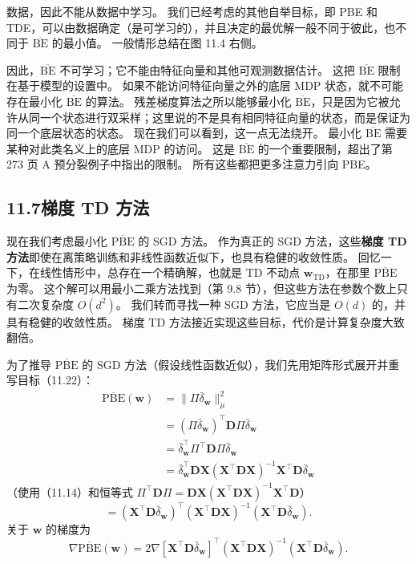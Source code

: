 \documentclass[UTF8, 12pt, fontset=fandol, oneside]{ctexart}
\begin{document}
数据，因此不能从数据中学习。
我们已经考虑的其他自举目标，即 PBE 和 TDE，可以由数据确定（是可学习的），并且决定的最优解一般不同于彼此，也不同于 $\overline{\mathrm{BE}}$ 的最小值。
一般情形总结在图 11.4 右侧。

因此，$\overline{\mathrm{BE}}$ 不可学习；它不能由特征向量和其他可观测数据估计。
这把 $\overline{\mathrm{BE}}$ 限制在基于模型的设置中。
如果不能访问特征向量之外的底层 MDP 状态，就不可能存在最小化 $\overline{\mathrm{BE}}$ 的算法。
残差梯度算法之所以能够最小化 $\overline{\mathrm{BE}}$，只是因为它被允许从同一个状态进行双采样；这里说的不是具有相同特征向量的状态，而是保证为同一个底层状态的状态。
现在我们可以看到，这一点无法绕开。
最小化 $\overline{\mathrm{BE}}$ 需要某种对此类名义上的底层 MDP 的访问。
这是 $\overline{\mathrm{BE}}$ 的一个重要限制，超出了第 273 页 A 预分裂例子中指出的限制。
所有这些都把更多注意力引向 PBE。

\subsection*{11.7\quad 梯度 TD 方法}

现在我们考虑最小化 $\overline{\mathrm{PBE}}$ 的 SGD 方法。
作为真正的 SGD 方法，这些\textbf{梯度 TD 方法}即使在离策略训练和非线性函数近似下，也具有稳健的收敛性质。
回忆一下，在线性情形中，总存在一个精确解，也就是 TD 不动点 $\mathbf{w}_{\mathrm{TD}}$，在那里 $\overline{\mathrm{PBE}}$ 为零。
这个解可以用最小二乘方法找到（第 9.8 节），但这些方法在参数个数上只有二次复杂度 $O(d^2)$。
我们转而寻找一种 SGD 方法，它应当是 $O(d)$ 的，并具有稳健的收敛性质。
梯度 TD 方法接近实现这些目标，代价是计算复杂度大致翻倍。

为了推导 $\overline{\mathrm{PBE}}$ 的 SGD 方法（假设线性函数近似），我们先用矩阵形式展开并重写目标（11.22）：
\begin{equation}
\begin{aligned}
\overline{\mathrm{PBE}}(\mathbf{w})
&=\|\Pi\bar\delta_{\mathbf{w}}\|_\mu^2\\
&=(\Pi\bar\delta_{\mathbf{w}})^\top\mathbf{D}\Pi\bar\delta_{\mathbf{w}}\\
&=\bar\delta_{\mathbf{w}}^\top\Pi^\top\mathbf{D}\Pi\bar\delta_{\mathbf{w}}\\
&=\bar\delta_{\mathbf{w}}^\top\mathbf{D}\mathbf{X}(\mathbf{X}^\top\mathbf{D}\mathbf{X})^{-1}\mathbf{X}^\top\mathbf{D}\bar\delta_{\mathbf{w}}
\end{aligned}
\tag{11.25}
\end{equation}
（使用（11.14）和恒等式
$\Pi^\top\mathbf{D}\Pi=\mathbf{D}\mathbf{X}(\mathbf{X}^\top\mathbf{D}\mathbf{X})^{-1}\mathbf{X}^\top\mathbf{D}$）
\begin{equation}
=\left(\mathbf{X}^\top\mathbf{D}\bar\delta_{\mathbf{w}}\right)^\top
\left(\mathbf{X}^\top\mathbf{D}\mathbf{X}\right)^{-1}
\left(\mathbf{X}^\top\mathbf{D}\bar\delta_{\mathbf{w}}\right).
\tag{11.26}
\end{equation}
关于 $\mathbf{w}$ 的梯度为
\[
\nabla\overline{\mathrm{PBE}}(\mathbf{w})
=2\nabla\left[\mathbf{X}^\top\mathbf{D}\bar\delta_{\mathbf{w}}\right]^\top
\left(\mathbf{X}^\top\mathbf{D}\mathbf{X}\right)^{-1}
\left(\mathbf{X}^\top\mathbf{D}\bar\delta_{\mathbf{w}}\right).
\]
\end{document}
